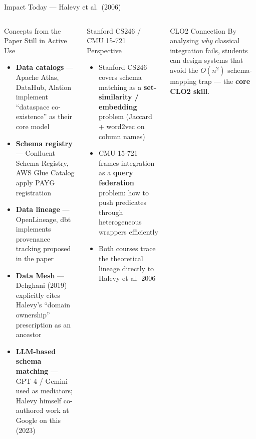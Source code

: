 \documentclass[aspectratio=169,10pt]{beamer}
\begin{document}
\begin{frame}{Impact Today — Halevy et al.\ (2006)}
  \begin{columns}[T]
      \begin{block}{Concepts from the Paper Still in Active Use}
        \begin{itemize}
          \item \textbf{Data catalogs} — Apache Atlas, DataHub, Alation
                implement ``dataspace co-existence'' as their core model
          \item \textbf{Schema registry} — Confluent Schema Registry,
                AWS Glue Catalog apply PAYG registration
          \item \textbf{Data lineage} — OpenLineage, dbt implements
                provenance tracking proposed in the paper
          \item \textbf{Data Mesh} — Dehghani (2019) explicitly cites
                Halevy's ``domain ownership'' prescription as an ancestor
          \item \textbf{LLM-based schema matching} — GPT-4 / Gemini
                used as mediators; Halevy himself co-authored work at
                Google on this (2023)
        \end{itemize}
      \end{block}

      \begin{exampleblock}{Stanford CS246 / CMU 15-721 Perspective}
        \begin{itemize}
          \item Stanford CS246 covers schema matching as a
                \textbf{set-similarity / embedding} problem (Jaccard +
                word2vec on column names)
          \item CMU 15-721 frames integration as a \textbf{query
                federation} problem: how to push predicates through
                heterogeneous wrappers efficiently
          \item Both courses trace the theoretical lineage directly
                to Halevy et al.\ 2006
        \end{itemize}
      \end{exampleblock}
      \vspace{5pt}
      \begin{alertblock}{CLO2 Connection}
        By analysing \emph{why} classical integration fails,
        students can design systems that avoid the $O(n^2)$
        schema-mapping trap — the \textbf{core CLO2 skill}.
      \end{alertblock}
  \end{columns}
\end{frame}
\end{document}
